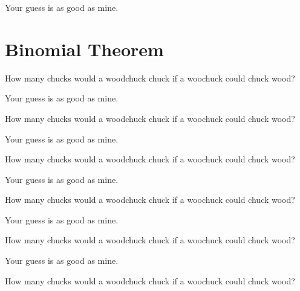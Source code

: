 \documentclass[12pt]{article}
\newenvironment{question}[2][Q]{\begin{trivlist}
\item[\hskip \labelsep {\bfseries #1}\hskip \labelsep {\bfseries #2.}]}{\end{trivlist}}
\newenvironment{answer}[2][A]{\begin{trivlist}
\item[\hskip \labelsep {\bfseries #1}\hskip \labelsep {\bfseries #2.}]}{\end{trivlist}}
\begin{document}
\begin{answer}{25}
Your guess is as good as mine.
\end{answer}

\section{Binomial Theorem}

\begin{question}{26}
  How many chucks would a woodchuck chuck if a woochuck could chuck wood?
\end{question}

\begin{answer}{26}
Your guess is as good as mine.
\end{answer}
\begin{question}{27}
  How many chucks would a woodchuck chuck if a woochuck could chuck wood?
\end{question}

\begin{answer}{27}
Your guess is as good as mine.
\end{answer}
\begin{question}{28}
  How many chucks would a woodchuck chuck if a woochuck could chuck wood?
\end{question}

\begin{answer}{28}
Your guess is as good as mine.
\end{answer}
\begin{question}{29}
  How many chucks would a woodchuck chuck if a woochuck could chuck wood?
\end{question}

\begin{answer}{29}
Your guess is as good as mine.
\end{answer}
\begin{question}{30}
  How many chucks would a woodchuck chuck if a woochuck could chuck wood?
\end{question}

\begin{answer}{30}
Your guess is as good as mine.
\end{answer}
\begin{question}{31}
  How many chucks would a woodchuck chuck if a woochuck could chuck wood?
\end{question}
\end{document}
